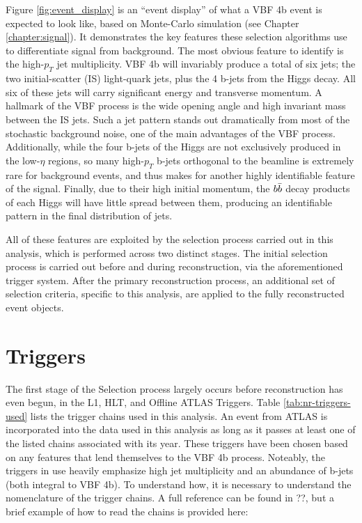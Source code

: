     Figure \ref{fig:event_display} is an ``event display'' of what a VBF \to 4b event is expected to look like,
        based on Monte-Carlo simulation (see Chapter \ref{chapter:signal}).
    It demonstrates the key features these selection algorithms use to differentiate signal from background.
    The most obvious feature to identify is the high-$p_T$ jet multiplicity.
    VBF \to 4b will invariably produce a total of six jets;
        the two initial-scatter (IS) light-quark jets, plus the 4 b-jets from the Higgs decay.
    All six of these jets will carry significant energy and transverse momentum.
    A hallmark of the VBF process is the wide opening angle and high invariant mass between the IS jets.
    Such a jet pattern stands out dramatically from most of the stochastic background noise,
        one of the main advantages of the VBF process.
    Additionally, while the four b-jets of the Higgs are not exclusively produced in the low-$\eta$ regions,
        so many high-$p_T$ b-jets orthogonal to the beamline is extremely rare for background events,
        and thus makes for another highly identifiable feature of the signal.
    Finally, due to their high initial momentum,
        the $b \bar{b}$ decay products of each Higgs will have little spread between them,
        producing an identifiable pattern in the final distribution of jets.

    All of these features are exploited by the selection process carried out in this analysis,
        which is performed across two distinct stages.
    The initial selection process is carried out before and during reconstruction, via the aforementioned trigger system.
    After the primary reconstruction process, an additional set of selection criteria,
        specific to this analysis, are applied to the fully reconstructed event objects.
    
    \section{Triggers}
        
        The first stage of the Selection process largely occurs before reconstruction has even begun,
            in the L1, HLT, and Offline ATLAS Triggers.
        Table \ref{tab:nr-triggers-used} lists the trigger chains used in this analysis.
        An event from ATLAS is incorporated into the data used in this analysis as long as it passes at least one 
            of the listed chains associated with its year.
        These triggers have been chosen based on any features that lend themselves to the VBF \to 4b process.
        Noteably, the triggers in use heavily emphasize high jet multiplicity and an abundance of b-jets
            (both integral to VBF \to 4b).
        To understand how, it is necessary to understand the nomenclature of the trigger chains.
        A full reference can be found in ??, but a brief example of how to read the chains is provided here:

